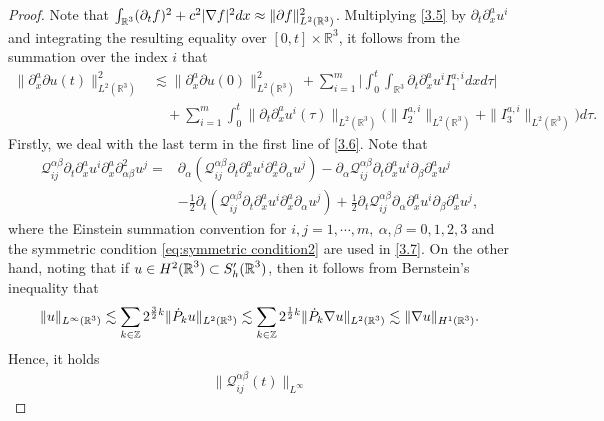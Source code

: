 \documentclass[11pt,twoside]{article}
\def\cQ{\mathcal Q}
\def\Z{\mathop{\mathbb Z\kern 0pt}\nolimits}
\def\R{\mathop{\mathbb R\kern 0pt}\nolimits}
\def\f{\frac}
\def\p{\partial}
\def\ls{\lesssim}
\newcommand{\pk}{\dot{P}_k}
\theoremstyle{plain}
\theoremstyle{definition}
\numberwithin{equation}{section}
\begin{document}
\begin{proof}
	Note that $\int_{\R^3}(\p_t f)^2 + c^2|\nabla f|^2 dx \approx \|\partial f\|_{L^2(\mathbb{R}^3)}^2 $.
Multiplying \eqref{3.5} by $\partial_t \partial_x^a u^i$ and integrating the resulting equality over
	$[0,t] \times \mathbb{R}^3$, it follows from the summation over the index $i$ that
	\begin{equation}\label{3.6}
		\begin{aligned}
			\|\partial_x^a\partial  u(t)\|_{L^2(\mathbb{R}^3)}^2 &\lesssim \| \partial_x^a\partial u(0)\|_{L^2(\mathbb{R}^3)}^2
+ \sum_{i=1}^{m}\big| \int_0^t \int_{\mathbb{R}^3} \partial_t \partial_x^a u^i I_1^{a,i} dx d\tau \big| \\
			&\quad +\sum_{i=1}^{m} \int_0^t \|\partial_t \partial_x^a u^i(\tau)\|_{L^2(\mathbb{R}^3)} \big(\|I_2^{a,i}\|_{L^2(\mathbb{R}^3)}+\|I_3^{a,i}\|_{L^2(\mathbb{R}^3)}\big) d\tau.
		\end{aligned}
	\end{equation}
	Firstly, we deal with the last term in the first line of \eqref{3.6}. Note that
	\begin{equation}\label{3.7}
		\begin{aligned}
			\cQ^{\alpha\beta}_{ij} \partial_t \partial_x^a u^i  \p_x^a\partial_{\alpha\beta}^2 u^j
			=&\partial_\alpha (\cQ^{\alpha\beta}_{ij} \partial_t \partial_x^a u^i  \p_x^a\partial_{\alpha} u^j)
			-\p_\alpha \cQ^{\alpha\beta}_{ij}\partial_t \partial_x^a u^i \partial_\beta \partial_x^a u^j\\
			&-\frac{1}{2} \partial_t (\cQ^{\alpha\beta}_{ij} \partial_t \partial_x^a u^i  \p_x^a\partial_{\alpha} u^j)
			+\frac{1}{2} \p_t \cQ^{\alpha\beta}_{ij}  \partial_\alpha \partial_x^a u^i \partial_\beta \partial_x^a u^j ,
		\end{aligned}
	\end{equation}
	where the Einstein summation convention for $i,j = 1,\cdots,m,\ \alpha,\beta=0,1,2,3$ and the symmetric condition \eqref{eq:symmetric condition2} are used in \eqref{3.7}. On the other hand, noting that if $u\in H^2(\R^3)\subset S'_h(\R^3)$, then it follows from Bernstein's inequality that
	\begin{equation*}
		\|u\|_{L^\infty(\R^3)}
		\ls
		\sum_{k\in\Z}2^{\f32 k}\|\pk u\|_{L^2(\R^3)}
		\ls
		\sum_{k\in\Z}2^{\f12 k}\|\pk\nabla u\|_{L^2(\R^3)}
		\ls
		\|\nabla u\|_{H^{1}(\R^3)}.
	\end{equation*}
	Hence, it holds
	\begin{equation}\label{3.8}
		\begin{aligned}
			\|\cQ^{\alpha\beta}_{ij}(t)\|_{L^\infty}

\end{aligned}
\end{equation}
\end{proof}
\end{document}
